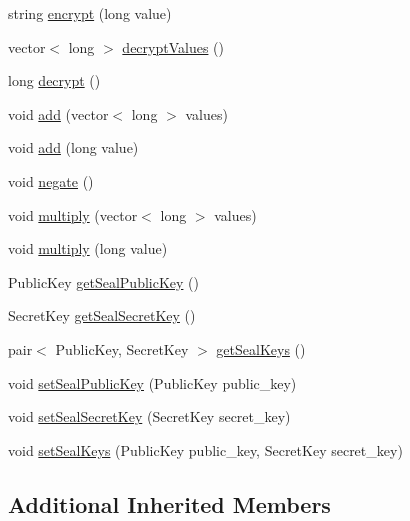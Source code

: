 \begin{DoxyCompactItemize}
\item 
string \mbox{\hyperlink{classhomomorphine_1_1_seal_backend_af64a70096e488a75aadbd934cf73d482}{encrypt}} (long value)
\item 
vector$<$ long $>$ \mbox{\hyperlink{classhomomorphine_1_1_seal_backend_afa5f6cbb10d74c1911fcb88f722a0159}{decrypt\+Values}} ()
\item 
long \mbox{\hyperlink{classhomomorphine_1_1_seal_backend_a0496053defd79b8bd42d4d9c6b4b4ccc}{decrypt}} ()
\item 
void \mbox{\hyperlink{classhomomorphine_1_1_seal_backend_ae868a22dda1eed2246c59aa831707bf1}{add}} (vector$<$ long $>$ values)
\item 
void \mbox{\hyperlink{classhomomorphine_1_1_seal_backend_acbff51d94165f4e578cafaeb965e4367}{add}} (long value)
\item 
void \mbox{\hyperlink{classhomomorphine_1_1_seal_backend_a9064cf9822de85af9120528cef084bea}{negate}} ()
\item 
void \mbox{\hyperlink{classhomomorphine_1_1_seal_backend_ace0bb8cd6a0e4b22f6e3e7ab00ea1197}{multiply}} (vector$<$ long $>$ values)
\item 
void \mbox{\hyperlink{classhomomorphine_1_1_seal_backend_afd8f13068d81c0038b966df4219e8033}{multiply}} (long value)
\item 
Public\+Key \mbox{\hyperlink{classhomomorphine_1_1_seal_backend_ae643453f9f2b82beb532a98253ef13d7}{get\+Seal\+Public\+Key}} ()
\item 
Secret\+Key \mbox{\hyperlink{classhomomorphine_1_1_seal_backend_a37bae1b8c7ce56871bc597bb334018a5}{get\+Seal\+Secret\+Key}} ()
\item 
pair$<$ Public\+Key, Secret\+Key $>$ \mbox{\hyperlink{classhomomorphine_1_1_seal_backend_af12f7bbba973928bd2944b837f4202c4}{get\+Seal\+Keys}} ()
\item 
void \mbox{\hyperlink{classhomomorphine_1_1_seal_backend_a507f226b61253d9849925c56c666647f}{set\+Seal\+Public\+Key}} (Public\+Key public\+\_\+key)
\item 
void \mbox{\hyperlink{classhomomorphine_1_1_seal_backend_a29fe49c698da831effdb80fb32def045}{set\+Seal\+Secret\+Key}} (Secret\+Key secret\+\_\+key)
\item 
void \mbox{\hyperlink{classhomomorphine_1_1_seal_backend_a565461880ff401eeb2202ea5fadb8f9f}{set\+Seal\+Keys}} (Public\+Key public\+\_\+key, Secret\+Key secret\+\_\+key)
\end{DoxyCompactItemize}
\subsection*{Additional Inherited Members}


